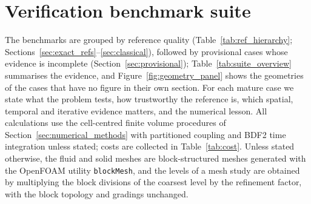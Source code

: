 \section{Verification benchmark suite}\label{sec:benchmark_suite}

The benchmarks are grouped by reference quality (Table~\ref{tab:ref_hierarchy}; Sections~\ref{sec:exact_refs}--\ref{sec:classical}), followed by provisional cases whose evidence is incomplete (Section~\ref{sec:provisional}); Table~\ref{tab:suite_overview} summarises the evidence, and Figure~\ref{fig:geometry_panel} shows the geometries of the cases that have no figure in their own section.
For each mature case we state what the problem tests, how trustworthy the reference is, which spatial, temporal and iterative evidence matters, and the numerical lesson.
All calculations use the cell-centred finite volume procedures of Section~\ref{sec:numerical_methods} with partitioned coupling and BDF2 time integration unless stated; costs are collected in Table~\ref{tab:cost}.
Unless stated otherwise, the fluid and solid meshes are block-structured meshes generated with the OpenFOAM utility \texttt{blockMesh}, and the levels of a mesh study are obtained by multiplying the block divisions of the coarsest level by the refinement factor, with the block topology and gradings unchanged.

